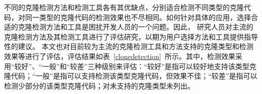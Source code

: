 不同的克隆检测方法和检测工具各有其优缺点，分别适合检测不同类型的克隆代码，对同一类型的克隆代码的检测效果也不尽相同。如何针对具体的应用，选择合适的克隆检测方法和工具是困扰开发人员的一个问题。因此，
研究人员对主流的克隆检测方法及其检测工具进行了评估研究，以期为用户选择方法和工具提供指导性的建议\cite{bellon2007comparison}\cite{rattan2013software}\cite{roy2009comparison}\cite{svajlenko2014evaluating}。%
本文也对目前较为主流的克隆检测工具和方法支持的克隆类型和检测效果等进行了评估，评估结果如表~\ref{clonedetection}~所示。其中，检测效果采用“较好”、“一般”和“较差”三种级别来评估：“较好”是指可以较好地支持该类型克隆代码；“一般”是指可以支持检测该类型克隆代码，但效果不佳；“较差”是指可以检测少部分的该类型克隆代码；对未支持的克隆类型未列出。

